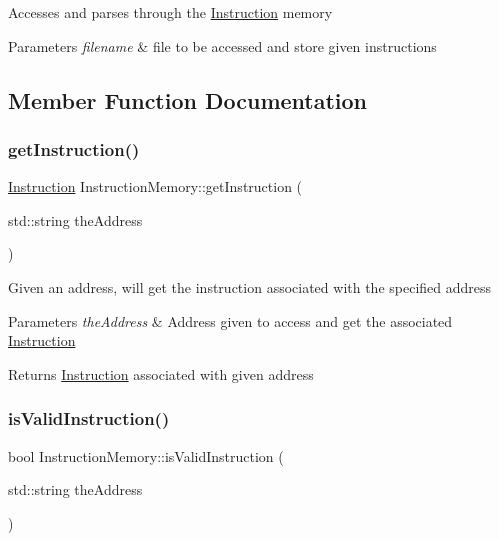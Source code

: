 Accesses and parses through the \mbox{\hyperlink{class_instruction}{Instruction}} memory 
\begin{DoxyParams}{Parameters}
{\em filename} & file to be accessed and store given instructions \\
\hline
\end{DoxyParams}


\subsection{Member Function Documentation}
\mbox{\label{class_instruction_memory_a9991daa81af7611a8ff76bbbd4b64630}} 
\subsubsection{\texorpdfstring{get\+Instruction()}{getInstruction()}}
{\footnotesize\ttfamily \mbox{\hyperlink{class_instruction}{Instruction}} Instruction\+Memory\+::get\+Instruction (\begin{DoxyParamCaption}\item[{std\+::string}]{the\+Address }\end{DoxyParamCaption})}

Given an address, will get the instruction associated with the specified address 
\begin{DoxyParams}{Parameters}
{\em the\+Address} & Address given to access and get the associated \mbox{\hyperlink{class_instruction}{Instruction}} \\
\hline
\end{DoxyParams}
\begin{DoxyReturn}{Returns}
\mbox{\hyperlink{class_instruction}{Instruction}} associated with given address 
\end{DoxyReturn}
\mbox{\label{class_instruction_memory_a530d8236c9ddb2827d13a17bb5a6cdd6}} 
\subsubsection{\texorpdfstring{is\+Valid\+Instruction()}{isValidInstruction()}}
{\footnotesize\ttfamily bool Instruction\+Memory\+::is\+Valid\+Instruction (\begin{DoxyParamCaption}\item[{std\+::string}]{the\+Address }\end{DoxyParamCaption})}

